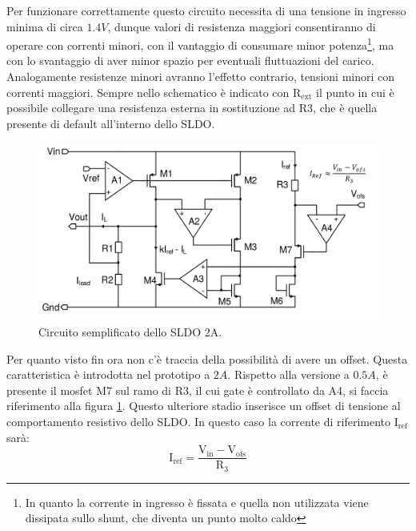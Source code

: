 Per funzionare correttamente questo circuito necessita di una tensione in ingresso minima di circa $1.4V$, dunque valori di resistenza maggiori consentiranno di operare con correnti minori, con il vantaggio di consumare minor potenza\footnote{In quanto la corrente in ingresso è fissata e quella non utilizzata viene dissipata sullo shunt, che diventa un punto molto caldo}, ma con lo svantaggio di aver minor spazio per eventuali fluttuazioni del carico. 
Analogamente resistenze minori avranno l'effetto contrario, tensioni minori con correnti maggiori.
Sempre nello schematico è indicato con $\mathrm{R_{ext}}$ il punto in cui è possibile collegare una resistenza esterna in sostituzione ad R3, che è quella presente di default all'interno dello SLDO.
\begin{figure}
\centering
\includegraphics[scale=.3]{Immagini/SLDO2A}
\caption{Circuito semplificato dello SLDO 2A.}
\label{SLDO2A}
\end{figure}
Per quanto visto fin ora non c'è traccia della possibilità di avere un offset. Questa caratteristica è introdotta nel prototipo a $2A$.
Rispetto alla versione a $0.5A$, è presente il mosfet M7 sul ramo di R3, il cui gate è controllato da A4, si faccia riferimento alla figura \ref{SLDO2A}. Questo ulteriore stadio inserisce un offset di tensione al comportamento resistivo dello SLDO. In questo caso la corrente di riferimento $\mathrm{I_{ref}}$ sarà:
\begin{equation}
\mathrm{I_{ref} = \frac{V_{in} - V_{ofs}}{R_3}}
\end{equation}

